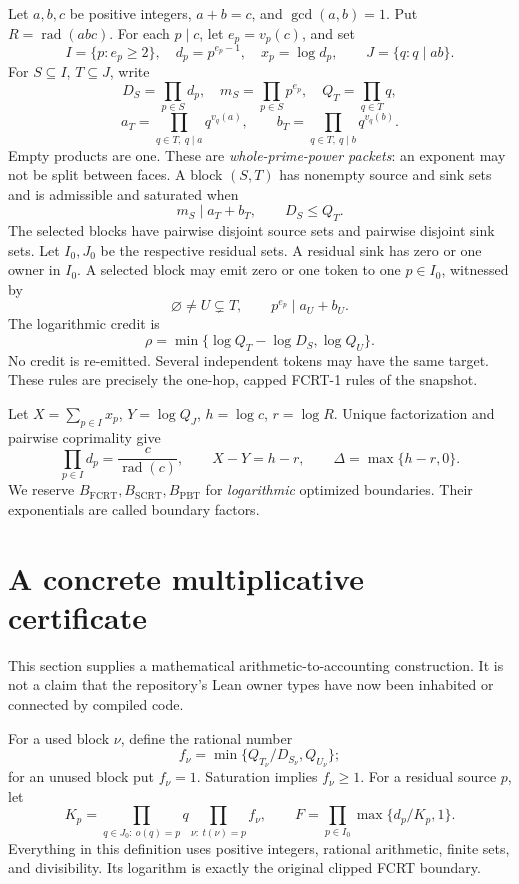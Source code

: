 \documentclass[11pt]{article}
\theoremstyle{definition}\newtheorem{definition}[theorem]{Definition}
\theoremstyle{remark}\newtheorem{remark}[theorem]{Remark}
\newcommand{\rad}{\operatorname{rad}}
\newcommand{\FCRT}{\mathrm{FCRT}}
\newcommand{\SCRT}{\mathrm{SCRT}}
\newcommand{\PBT}{\mathrm{PBT}}
\begin{document}
Let \(a,b,c\) be positive integers, \(a+b=c\), and \(\gcd(a,b)=1\).
Put \(R=\rad(abc)\). For each \(p\mid c\), let \(e_p=v_p(c)\), and set
\[
 I=\{p:e_p\ge2\},\quad d_p=p^{e_p-1},\quad x_p=\log d_p,
 \qquad J=\{q:q\mid ab\}.
\]
For \(S\subseteq I\), \(T\subseteq J\), write
\[
 D_S=\prod_{p\in S}d_p,\quad m_S=\prod_{p\in S}p^{e_p},\quad
 Q_T=\prod_{q\in T}q,
\]
\[
 a_T=\prod_{q\in T,\ q\mid a}q^{v_q(a)},\qquad
 b_T=\prod_{q\in T,\ q\mid b}q^{v_q(b)}.
\]
Empty products are one. These are \emph{whole-prime-power packets}: an
exponent may not be split between faces. A block \((S,T)\) has nonempty
source and sink sets and is admissible and saturated when
\begin{equation}\label{eq:block}
 m_S\mid a_T+b_T,\qquad D_S\le Q_T.
\end{equation}
The selected blocks have pairwise disjoint source sets and pairwise disjoint
sink sets. Let \(I_0,J_0\) be the respective residual sets. A residual sink
has zero or one owner in \(I_0\). A selected block may emit zero or one token
to one \(p\in I_0\), witnessed by
\begin{equation}\label{eq:flag}
 \varnothing\ne U\subsetneq T,\qquad p^{e_p}\mid a_U+b_U.
\end{equation}
The logarithmic credit is
\[
 \rho=\min\{\log Q_T-\log D_S,\log Q_U\}.
\]
No credit is re-emitted. Several independent tokens may have the same target.
These rules are precisely the one-hop, capped FCRT-1 rules of the snapshot.

Let \(X=\sum_{p\in I}x_p\), \(Y=\log Q_J\), \(h=\log c\),
\(r=\log R\). Unique factorization and pairwise coprimality give
\begin{equation}\label{eq:height}
 \prod_{p\in I}d_p=\frac{c}{\rad(c)},\qquad
 X-Y=h-r,\qquad \Delta=\max\{h-r,0\}.
\end{equation}
We reserve \(B_{\FCRT},B_{\SCRT},B_{\PBT}\) for \emph{logarithmic}
optimized boundaries. Their exponentials are called boundary factors.

\section{A concrete multiplicative certificate}
This section supplies a mathematical arithmetic-to-accounting construction.
It is not a claim that the repository's Lean owner types have now been
inhabited or connected by compiled code.

For a used block \(\nu\), define the rational number
\begin{equation}\label{eq:creditfactor}
 f_\nu=\min\{Q_{T_\nu}/D_{S_\nu},Q_{U_\nu}\};
\end{equation}
for an unused block put \(f_\nu=1\). Saturation implies \(f_\nu\ge1\).
For a residual source \(p\), let
\[
 K_p=\prod_{q\in J_0:\ o(q)=p}q
       \prod_{\nu:\ t(\nu)=p}f_\nu,
 \qquad
 F=\prod_{p\in I_0}\max\{d_p/K_p,1\}.
\]
Everything in this definition uses positive integers, rational arithmetic,
finite sets, and divisibility. Its logarithm is exactly the original clipped
FCRT boundary.
\end{document}
